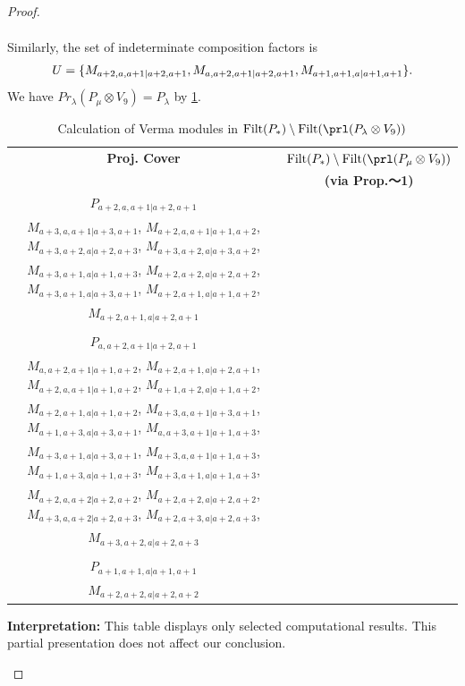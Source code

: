 \begin{proof}
\begin{enumerate}
\begin{enumerate}
\begin{equation}
\begin{aligned}
          \end{aligned}
        \end{equation}
      Similarly, the set of indeterminate composition factors is 
\begin{equation}\notag
  \begin{aligned}
    U = \{
M_{a+2,a,a+1|a+2,a+1},
M_{a,a+2,a+1|a+2,a+1},
M_{a+1,a+1,a|a+1,a+1}
\}.
  \end{aligned}
\end{equation}
       We have $Pr_{\lambda}(P_\mu \otimes V_{9}) = P_\lambda  $ by \cref{tab:verma-analysis_11}.
\begin{table}[htbp]
\centering
\caption{Calculation of Verma modules in $\operatorname{Filt}(P_*) \setminus \operatorname{Filt}(\prl(P_\lambda \otimes V_{9})) $ } \label{tab:verma-analysis_11}
\begin{tabular}{cc}
\toprule
\textbf{Proj. Cover} & \textbf{$\operatorname{Filt}(P_*) \setminus \operatorname{Filt}(\prl(P_\mu \otimes V_{9})) $}  \\
     & \textbf{(via Prop.～1)}  \\
\midrule
 $P_{a+2,a,a+1|a+2,a+1}$ & \makecell{
 $M_{a+3,a,a+2|a+2,a+3}$,
 $M_{a+3,a,a+2|a+3,a+2}$,
 $M_{a+3,a,a+1|a+1,a+3}$,
 $M_{a+2,a,a+2|a+2,a+2}$, \\
 $M_{a+3,a,a+1|a+3,a+1}$,
 $M_{a+2,a,a+1|a+1,a+2}$,
 $M_{a+3,a+2,a|a+2,a+3}$,
 $M_{a+3,a+2,a|a+3,a+2}$, \\
 $M_{a+3,a+1,a|a+1,a+3}$,
 $M_{a+2,a+2,a|a+2,a+2}$,
 $M_{a+3,a+1,a|a+3,a+1}$,
 $M_{a+2,a+1,a|a+1,a+2}$, \\
 $M_{a+2,a+1,a|a+2,a+1}$
}\\
 & \\
 $P_{a,a+2,a+1|a+2,a+1}$ & \makecell{
 $M_{a,a+3,a+1|a+3,a+1}$,
 $M_{a,a+2,a+2|a+2,a+2}$,
 $M_{a,a+3,a+2|a+2,a+3}$,
 $M_{a+1,a+2,a|a+2,a+1}$, \\
 $M_{a,a+2,a+1|a+1,a+2}$,
 $M_{a+2,a+1,a|a+2,a+1}$,
 $M_{a+2,a,a+1|a+1,a+2}$,
 $M_{a+1,a+2,a|a+1,a+2}$, \\
 $M_{a+2,a+1,a|a+1,a+2}$,
 $M_{a+3,a,a+1|a+3,a+1}$,
 $M_{a+1,a+3,a|a+3,a+1}$,
 $M_{a,a+3,a+1|a+1,a+3}$, \\
 $M_{a+3,a+1,a|a+3,a+1}$,
 $M_{a+3,a,a+1|a+1,a+3}$,
 $M_{a+1,a+3,a|a+1,a+3}$,
 $M_{a+3,a+1,a|a+1,a+3}$, \\
 $M_{a+2,a,a+2|a+2,a+2}$,
 $M_{a+2,a+2,a|a+2,a+2}$,
 $M_{a+3,a,a+2|a+2,a+3}$,
 $M_{a+2,a+3,a|a+2,a+3}$, \\
 $M_{a+3,a+2,a|a+2,a+3}$
}\\
 & \\
 $P_{a+1,a+1,a|a+1,a+1}$ & \makecell{
 $M_{a+2,a+1,a|a+2,a+1}$,
 $M_{a+2,a+1,a|a+1,a+2}$,
 $M_{a+1,a+2,a|a+2,a+1}$,
 $M_{a+1,a+2,a|a+1,a+2}$, \\
 $M_{a+2,a+2,a|a+2,a+2}$
}\\
\bottomrule
\end{tabular}
\vspace{0.5em}
\parbox{\linewidth}{\small
\textbf{Interpretation:}
This table displays only selected computational results. This partial presentation does not affect our conclusion.
}
\end{table}


\end{enumerate}
\end{enumerate}
\end{proof}

